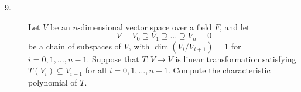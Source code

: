 \documentclass{article}
\begin{document}
\begin{description}
\item[9.]
Let $V$ be an $n$-dimensional vector space over a field $F$, and let
$$V= V_0 \supseteq V_1 \supseteq \dots \supseteq V_n = 0$$
be a chain of subspaces of $V$, with $\dim(V_i/ V_{i+1}) = 1$ for
$i=0,1, \dots, n-1$. Suppose that $T:V \to V$ is linear transformation
satisfying $T(V_i) \subseteq V_{i+1}$ for all $i = 0,1, \dots, n-1$.
Compute the characteristic polynomial of $T$.






\end{description}    
\end{document}
